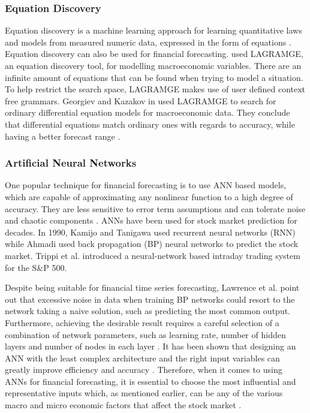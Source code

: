 \documentclass{UoYCSproject}
\begin{document}
\subsubsection{Equation Discovery}
Equation discovery is a machine learning approach for learning quantitative laws and models from measured numeric data, expressed in the form of equations \cite{Todorovski2010}. Equation discovery can also be used for financial forecasting.  \cite{kazakov2008equation}  used LAGRAMGE, an equation discovery tool, for modelling macroeconomic variables. There are an infinite amount of equations that can be found when trying to model a situation. To help restrict the search space, LAGRAMGE makes use of user defined context free grammars. Georgiev and Kazakov in \cite{Georgiev2012Equation} used LAGRAMGE to search for ordinary differential equation models for macroeconomic data. They conclude that differential equations match ordinary ones with regards to accuracy, while having a better forecast range \cite{Kokov2012Equation}.  

\subsubsection{Artificial Neural Networks}
One popular technique for financial forecasting is to use ANN based models, which are capable of approximating any nonlinear function to a high degree of accuracy. They are less sensitive to error term assumptions and can tolerate noise and chaotic components \cite{majhi2007stock}. ANNs have been used for stock market prediction for decades. In 1990, Kamijo and Tanigawa \cite{kamijo1990stock} used recurrent neural networks (RNN) while Ahmadi \cite{ahmadi1990testability} used back propagation (BP) neural networks to predict the stock market. Trippi et al. \cite{trippi1992trading} introduced a neural-network based intraday trading system for the S\&P 500. 

Despite being suitable for financial time series forecasting, Lawrence et al. \cite{lawrence1998noisy} point out that excessive noise in data when training BP networks could resort to the network taking a naive solution, such as predicting the most common output. Furthermore, achieving the desirable result requires a careful selection of a combination of network parameters, such as learning rate, number of hidden layers and number of nodes in each layer \cite{hussain2008financial}. It has been shown that designing an ANN with the least complex architecture and the right input variables can greatly improve efficiency and accuracy \cite{atsalakis2009surveying}. Therefore, when it comes to using ANNs for financial forecasting, it is essential to choose the most influential and representative inputs which, as mentioned earlier, can be any of the various macro and micro economic factors that affect the stock market \cite{zhong2017forecasting}. 
\end{document}
